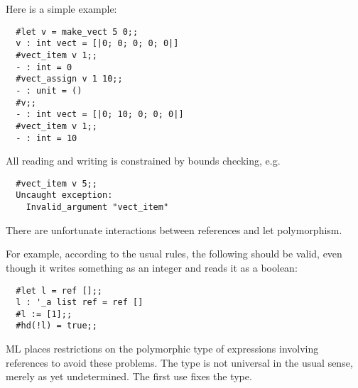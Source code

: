 \begin{slide*}


\vspace*{0.5cm}

Here is a simple example:

\begin{black}\begin{verbatim}
  #let v = make_vect 5 0;;
  v : int vect = [|0; 0; 0; 0; 0|]
  #vect_item v 1;;
  - : int = 0
  #vect_assign v 1 10;;
  - : unit = ()
  #v;;
  - : int vect = [|0; 10; 0; 0; 0|]
  #vect_item v 1;;
  - : int = 10
\end{verbatim}\end{black}

All reading and writing is constrained by bounds checking, e.g.

\begin{black}\begin{verbatim}
  #vect_item v 5;;
  Uncaught exception:
    Invalid_argument "vect_item"
\end{verbatim}\end{black}


\end{slide*}


\begin{slide*}


\vspace*{0.5cm}

There are unfortunate interactions between references and let polymorphism.

For example, according to the usual rules, the following should be valid, even
though it writes something as an integer and reads it as a boolean:

\begin{black}\begin{verbatim}
  #let l = ref [];;
  l : '_a list ref = ref []
  #l := [1];;
  #hd(!l) = true;;
\end{verbatim}\end{black}

ML places restrictions on the polymorphic type of expressions involving
references to avoid these problems. The type is not universal in the usual
sense, merely as yet undetermined. The first use fixes the type.

\end{slide*}





